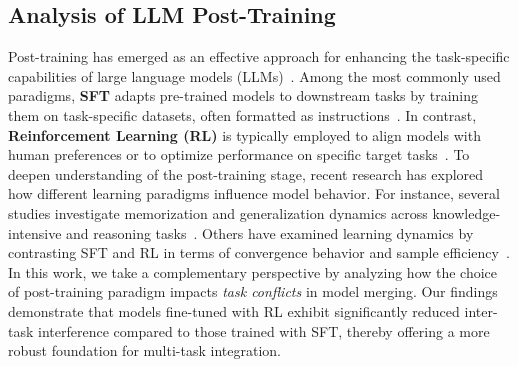 \documentclass{article} %
\begin{document}
\subsection{Analysis of LLM Post-Training}
Post-training has emerged as an effective approach for enhancing the task-specific capabilities of large language models (LLMs)~\citep{grattafiori2024llama, team2024qwen2, shao2024deepseekmath}. Among the most commonly used paradigms, \textbf{SFT} adapts pre-trained models to downstream tasks by training them on task-specific datasets, often formatted as instructions~\citep{wei2021finetuned, zhou2023lima, chung2024scaling, li2024x}. In contrast, \textbf{Reinforcement Learning (RL)} is typically employed to align models with human preferences or to optimize performance on specific target tasks~\citep{ouyang2022training, ahmadian2024back, guo2025deepseek,yang2025parallel, zhao2025imitate}. To deepen understanding of the post-training stage, recent research has explored how different learning paradigms influence model behavior. For instance, several studies investigate memorization and generalization dynamics across knowledge-intensive and reasoning tasks~\citep{allen2023physics, ye2024physics, qi2024quantifying, chu2025sft, kang2025what}. Others have examined learning dynamics by contrasting SFT and RL in terms of convergence behavior and sample efficiency~\citep{ren2024learning, zeng2025lensllm, kang2025what, shenfeld2025rl, mukherjee2025reinforcement}. In this work, we take a complementary perspective by analyzing how the choice of post-training paradigm impacts \textit{task conflicts} in model merging. Our findings demonstrate that models fine-tuned with RL exhibit significantly reduced inter-task interference compared to those trained with SFT, thereby offering a more robust foundation for multi-task integration.


\end{document}
